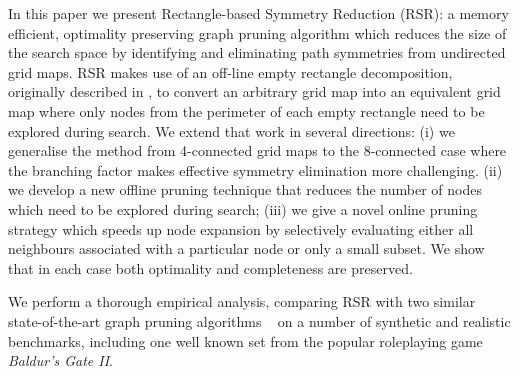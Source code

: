 %
\par
In this paper we present Rectangle-based Symmetry Reduction (RSR): a
memory efficient, optimality preserving graph pruning algorithm which reduces
the size of the search space by identifying and eliminating path symmetries from
undirected grid maps.
RSR makes use of an off-line empty rectangle decomposition, originally described in
\cite{harabor10}, to convert an arbitrary grid map into an equivalent grid map where only nodes from the 
perimeter of each empty rectangle need to be explored during search.
We extend that work in several directions: (i) we generalise the method from
4-connected grid maps to the 8-connected case where the branching factor makes
effective symmetry elimination more challenging.
(ii) we develop a new offline pruning technique that reduces the number of nodes which
need to be explored during search;
(iii) we give a novel online pruning strategy which speeds up node expansion by selectively 
evaluating either all neighbours associated with a particular node or only a small subset.
We show that in each case both optimality and completeness are preserved.
\par
We perform a thorough empirical analysis, comparing RSR with two similar
state-of-the-art graph pruning algorithms ~\cite{pochter10,harabor10}
on a number of synthetic and realistic benchmarks, including one well known set 
from the popular roleplaying game \emph{Baldur's Gate II}.
